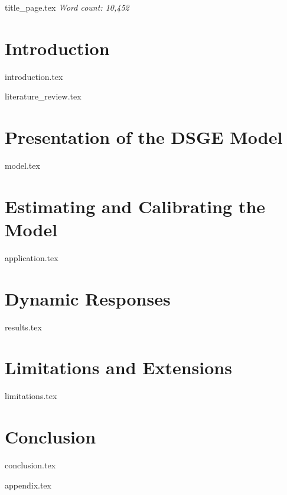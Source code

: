 \documentclass[12pt]{article}
\begin{document}
\setlength{\abovecaptionskip}{0pt}
\begin{sloppypar}
{title_page.tex}
\pagebreak
\textit{Word count: 10,452}
\tableofcontents
\pagebreak
{}

\section{Introduction}
{introduction.tex}
\newpage

{literature_review.tex}
\newpage

\section{Presentation of the DSGE Model}
{model.tex}
\newpage

\section{Estimating and Calibrating the Model} \label{application}
{application.tex}
\newpage

\section{Dynamic Responses}
{results.tex}
\newpage

\section{Limitations and Extensions}
{limitations.tex}
\newpage

\section{Conclusion}
{conclusion.tex}
\newpage
\printbibliography
\newpage

{appendix.tex}
\end{sloppypar}
\end{document}

